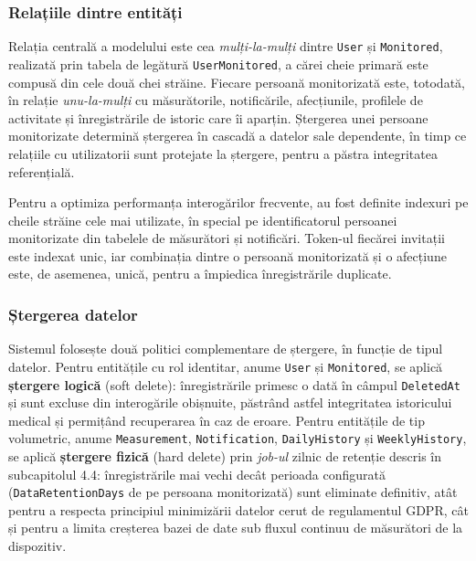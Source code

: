 \documentclass[12pt,a4paper]{article}
\begin{document}
\subsubsection{Relațiile dintre entități}

Relația centrală a modelului este cea \textit{mulți-la-mulți} dintre \texttt{User} și \texttt{Monitored}, realizată prin tabela de legătură \texttt{UserMonitored}, a cărei cheie primară este compusă din cele două chei străine. Fiecare persoană monitorizată este, totodată, în relație \textit{unu-la-mulți} cu măsurătorile, notificările, afecțiunile, profilele de activitate și înregistrările de istoric care îi aparțin. Ștergerea unei persoane monitorizate determină ștergerea în cascadă a datelor sale dependente, în timp ce relațiile cu utilizatorii sunt protejate la ștergere, pentru a păstra integritatea referențială.

Pentru a optimiza performanța interogărilor frecvente, au fost definite indexuri pe cheile străine cele mai utilizate, în special pe identificatorul persoanei monitorizate din tabelele de măsurători și notificări. Token-ul fiecărei invitații este indexat unic, iar combinația dintre o persoană monitorizată și o afecțiune este, de asemenea, unică, pentru a împiedica înregistrările duplicate.

\subsubsection{Ștergerea datelor}

Sistemul folosește două politici complementare de ștergere, în funcție de tipul datelor. Pentru entitățile cu rol identitar, anume \texttt{User} și \texttt{Monitored}, se aplică \textbf{ștergere logică} (soft delete): înregistrările primesc o dată în câmpul \texttt{DeletedAt} și sunt excluse din interogările obișnuite, păstrând astfel integritatea istoricului medical și permițând recuperarea în caz de eroare. Pentru entitățile de tip volumetric, anume \texttt{Measurement}, \texttt{Notification}, \texttt{DailyHistory} și \texttt{WeeklyHistory}, se aplică \textbf{ștergere fizică} (hard delete) prin \textit{job-ul} zilnic de retenție descris în subcapitolul 4.4: înregistrările mai vechi decât perioada configurată (\texttt{DataRetentionDays} de pe persoana monitorizată) sunt eliminate definitiv, atât pentru a respecta principiul minimizării datelor cerut de regulamentul GDPR, cât și pentru a limita creșterea bazei de date sub fluxul continuu de măsurători de la dispozitiv.
\end{document}
